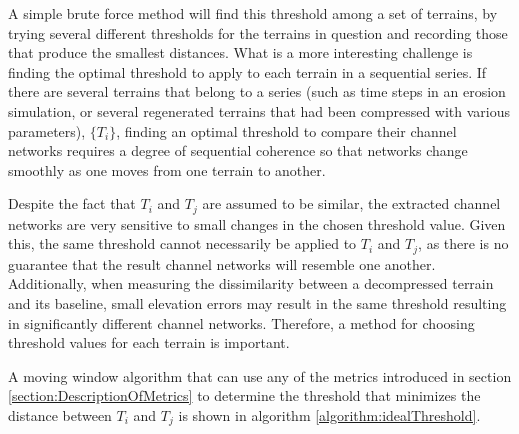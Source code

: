 A simple brute force method will find this threshold among a set of terrains, by trying several different thresholds for the terrains in question and recording those that produce the smallest distances.
What is a more interesting challenge is finding the optimal threshold to apply to each terrain in a sequential series. 
If there are several terrains that belong to a series (such as time steps in an erosion simulation, or several regenerated terrains that had been compressed with various parameters), $\{ T_{i} \}$, finding an optimal threshold to compare their channel networks requires a degree of sequential coherence so that networks change smoothly as one moves from one terrain to another.
% 
% 

Despite the fact that $T_{i}$ and $T_{j}$ are assumed to be similar, the extracted channel networks are very sensitive to small changes in the chosen threshold value. Given this, the same threshold cannot necessarily be applied to $T_{i}$ and $T_{j}$, as there is no guarantee that the result channel networks will resemble one another.
Additionally, when measuring the dissimilarity between a decompressed terrain and its baseline, small elevation errors may result in the same threshold resulting in significantly different channel networks. Therefore, a method for choosing threshold values for each terrain is important. 

A moving window algorithm that can use any of the metrics introduced in section \ref{section:DescriptionOfMetrics} to determine the threshold that minimizes the distance between $T_{i}$ and $T_{j}$ is shown in algorithm \ref{algorithm:idealThreshold}.


